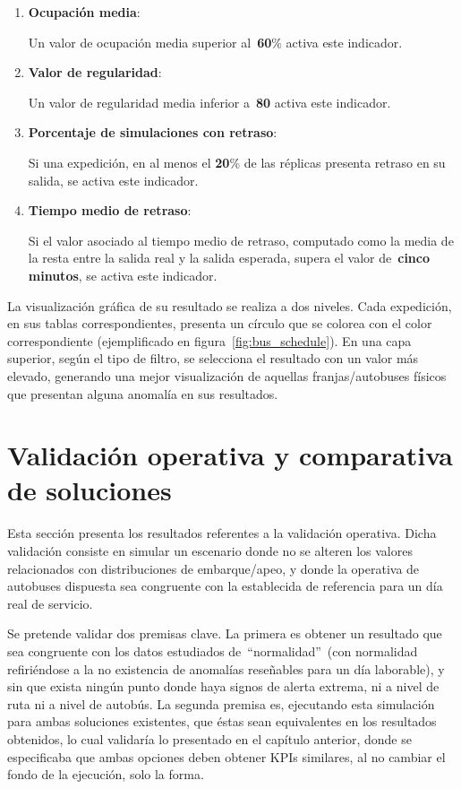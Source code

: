 \begin{enumerate}
    \item \textbf{Ocupación media}:
    
    Un valor de ocupación media superior al~\textbf{60}\% activa este indicador.

    \item \textbf{Valor de regularidad}:
    
    Un valor de regularidad media inferior a~\textbf{80} activa este indicador.

    \item \textbf{Porcentaje de simulaciones con retraso}:
    
    Si una expedición, en al menos el \textbf{20}\% de las réplicas presenta retraso en su salida, se activa este indicador.

    \item \textbf{Tiempo medio de retraso}:
    
    Si el valor asociado al tiempo medio de retraso, computado como la media de la resta entre la salida real y la salida esperada,
    supera el valor de~\textbf{cinco minutos}, se activa este indicador.
\end{enumerate}

La visualización gráfica de su resultado se realiza a dos niveles. Cada expedición, en sus tablas correspondientes, presenta un 
círculo que se colorea con el color correspondiente (ejemplificado en figura~\ref{fig:bus_schedule}). En una capa superior, según el tipo de filtro, se selecciona el resultado
con un valor más elevado, generando una mejor visualización de aquellas franjas/autobuses físicos que presentan alguna anomalía
en sus resultados.

\section{Validación operativa y comparativa de soluciones}\label{sec:validation}
Esta sección presenta los resultados referentes a la validación operativa. Dicha validación consiste en simular un escenario donde
no se alteren los valores relacionados con distribuciones de embarque/apeo, y donde la operativa de autobuses dispuesta sea congruente
con la establecida de referencia para un día real de servicio.

Se pretende validar dos premisas clave. La primera es obtener un resultado que sea congruente con los datos estudiados
de~\enquote{normalidad}~(con normalidad refiriéndose a la no existencia de anomalías reseñables para un día laborable), y
sin que exista ningún punto donde haya signos de alerta extrema, ni a nivel de ruta ni a nivel de autobús.
La segunda premisa es, ejecutando esta simulación para ambas soluciones existentes, que éstas sean equivalentes en los resultados obtenidos,
lo cual validaría lo presentado en el capítulo anterior, donde se especificaba que ambas opciones deben obtener KPIs similares,
al no cambiar el fondo de la ejecución, solo la forma.


